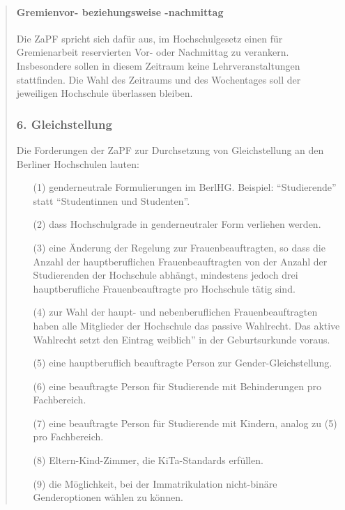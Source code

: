 \documentclass[DIV=14]{scrartcl}
\begin{document}
\begin{quote}
\hypertarget{gremienvor--beziehungsweise--nachmittag}{%
\paragraph{Gremienvor- beziehungsweise -nachmittag}\label{gremienvor--beziehungsweise--nachmittag}}

Die ZaPF spricht sich dafür aus, im Hochschulgesetz einen für
Gremienarbeit reservierten Vor- oder Nachmittag zu verankern.
Insbesondere sollen in diesem Zeitraum keine Lehrveranstaltungen
stattfinden. Die Wahl des Zeitraums und des Wochentages soll der
jeweiligen Hochschule überlassen bleiben.


\hypertarget{gleichstellung}{%
\subsubsection*{6. Gleichstellung}\label{gleichstellung}}

Die Forderungen der ZaPF zur Durchsetzung von Gleichstellung an den Berliner
Hochschulen lauten:
\begin{enumerate}
\item[(1)] genderneutrale Formulierungen im BerlHG. Beispiel:
  \enquote{Studierende} statt \enquote{Studentinnen und Studenten}.
\item[(2)] dass Hochschulgrade in genderneutraler Form verliehen werden.
\item[(3)] eine Änderung der Regelung zur Frauenbeauftragten, so dass die Anzahl
  der hauptberuflichen Frauenbeauftragten von der Anzahl der Studierenden der
  Hochschule abhängt, mindestens jedoch drei hauptberufliche Frauenbeauftragte
  pro Hochschule tätig sind.
\item[(4)] zur Wahl der haupt- und nebenberuflichen Frauenbeauftragten haben
  alle Mitglieder der Hochschule das passive Wahlrecht. Das aktive Wahlrecht
  setzt den Eintrag \glqq weiblich'' in der Geburtsurkunde voraus.
\item[(5)] eine hauptberuflich beauftragte Person zur Gender-Gleichstellung.
\item[(6)] eine beauftragte Person für Studierende mit Behinderungen %
  pro Fachbereich.
\item[(7)] eine beauftragte Person für Studierende mit Kindern, analog zu (5)
  pro Fachbereich.
\item[(8)] Eltern-Kind-Zimmer, die KiTa-Standards erfüllen.
\item[(9)] die Möglichkeit, bei der Immatrikulation nicht-binäre Genderoptionen
  wählen zu können.
\end{enumerate}


\end{quote}
\end{document}
